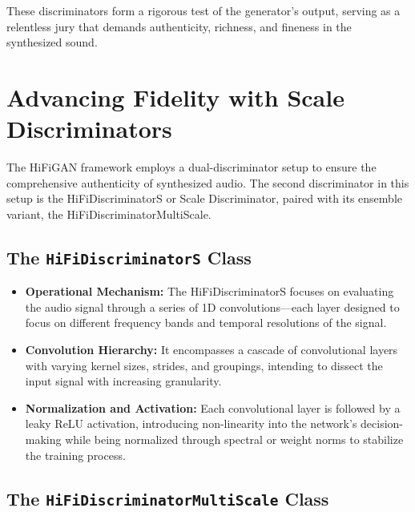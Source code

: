 \documentclass[a4paper]{article}
\begin{document}
These discriminators form a rigorous test of the generator's output, serving as a relentless jury that demands authenticity, richness, and fineness in the synthesized sound.



\section{Advancing Fidelity with Scale Discriminators}

The HiFiGAN framework employs a dual-discriminator setup to ensure the comprehensive authenticity of synthesized audio. The second discriminator in this setup is the HiFiDiscriminatorS or Scale Discriminator, paired with its ensemble variant, the HiFiDiscriminatorMultiScale.

\subsection{The \texttt{HiFiDiscriminatorS} Class}

\begin{itemize}
  \item \textbf{Operational Mechanism:} The HiFiDiscriminatorS focuses on evaluating the audio signal through a series of 1D convolutions—each layer designed to focus on different frequency bands and temporal resolutions of the signal.
  
  \item \textbf{Convolution Hierarchy:} It encompasses a cascade of convolutional layers with varying kernel sizes, strides, and groupings, intending to dissect the input signal with increasing granularity.
  
  \item \textbf{Normalization and Activation:} Each convolutional layer is followed by a leaky ReLU activation, introducing non-linearity into the network's decision-making while being normalized through spectral or weight norms to stabilize the training process.
\end{itemize}

\subsection{The \texttt{HiFiDiscriminatorMultiScale} Class}
\end{document}
